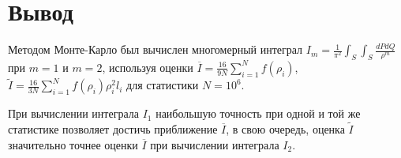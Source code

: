 \documentclass[
11pt,
master, %
subf, %
href, %
colorlinks=true, %
times, %
]{disser}
\begin{document}
\section{Вывод}
Методом Монте-Карло был вычислен многомерный интеграл $\displaystyle I_m = \frac{1}{\pi^2}\int_S\int_S \frac{dP dQ}{\rho^m}$ при $m=1$ и $m=2$, используя оценки $\displaystyle\overline{I} = \frac{16}{9N}\sum_{i=1}^{N}f(\rho_i)$, $\displaystyle\tilde{I} = \frac{16}{3N}\sum_{i=1}^{N}f(\rho_i)\rho_i^2 l_i$ для статистики $N = 10^6$.

При вычислении интеграла $I_1$ наибольшую точность при одной и той же статистике позволяет достичь приближение $\displaystyle\overline{I}$, в свою очередь, оценка $\displaystyle\tilde{I}$ значительно точнее оценки $\displaystyle\overline{I}$ при вычислении интеграла $I_2$.
\end{document}
